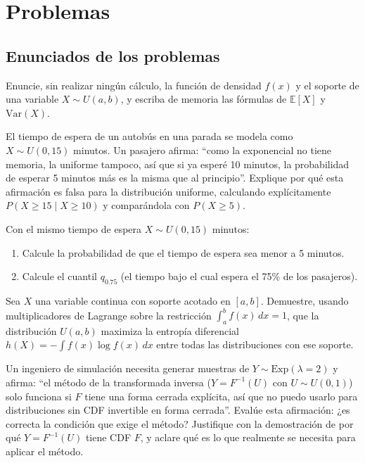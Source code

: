 \section*{Problemas}

\subsection*{Enunciados de los problemas}

\begin{problema}
	\label{prob:97c4388}
	Enuncie, sin realizar ningún cálculo, la función de densidad $f(x)$ y el soporte de una variable $X \sim U(a,b)$, y escriba de memoria las fórmulas de $\mathbb{E}[X]$ y $\text{Var}(X)$.
\end{problema}

\begin{problema}
	\label{prob:9f6e77c}
	El tiempo de espera de un autobús en una parada se modela como $X \sim U(0, 15)$ minutos. Un pasajero afirma: ``como la exponencial no tiene memoria, la uniforme tampoco, así que si ya esperé 10 minutos, la probabilidad de esperar 5 minutos más es la misma que al principio''. Explique por qué esta afirmación es falsa para la distribución uniforme, calculando explícitamente $P(X \ge 15 \mid X \ge 10)$ y comparándola con $P(X \ge 5)$.
\end{problema}

\begin{problema}
	\label{prob:8fcc221}
	Con el mismo tiempo de espera $X \sim U(0, 15)$ minutos:
	\begin{enumerate}
		\item Calcule la probabilidad de que el tiempo de espera sea menor a 5 minutos.
		\item Calcule el cuantil $q_{0.75}$ (el tiempo bajo el cual espera el 75\% de los pasajeros).
	\end{enumerate}
\end{problema}

\begin{problema}
	\label{prob:5794e09}
	Sea $X$ una variable continua con soporte acotado en $[a,b]$. Demuestre, usando multiplicadores de Lagrange sobre la restricción $\int_a^b f(x)\,dx=1$, que la distribución $U(a,b)$ maximiza la entropía diferencial $h(X) = -\int f(x)\log f(x)\,dx$ entre todas las distribuciones con ese soporte.
\end{problema}

\begin{problema}
	\label{prob:126be41}
	Un ingeniero de simulación necesita generar muestras de $Y \sim \text{Exp}(\lambda=2)$ y afirma: ``el método de la transformada inversa ($Y = F^{-1}(U)$ con $U \sim U(0,1)$) solo funciona si $F$ tiene una forma cerrada explícita, así que no puedo usarlo para distribuciones sin CDF invertible en forma cerrada''. Evalúe esta afirmación: ¿es correcta la condición que exige el método? Justifique con la demostración de por qué $Y=F^{-1}(U)$ tiene CDF $F$, y aclare qué es lo que realmente se necesita para aplicar el método.
\end{problema}

